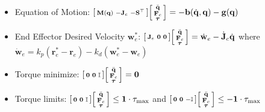 \documentclass[landscape,a0paper,fontscale=0.285]{baposter} %
\renewenvironment{bmatrix}{\left[\begin{smallmatrix}}{\end{smallmatrix}\right]}
\begin{document}
\begin{poster}
{\begin{itemize}
    \item Equation of Motion: $\begin{bmatrix}\mathbf{M}(\mathbf{q}) & -\mathbf{J}_c & -\mathbf{S}^\top\end{bmatrix}\begin{bmatrix}\ddot{\mathbf{q}} \\ \mathbf{F}_c \\ \boldsymbol{\tau}\end{bmatrix} = -\mathbf{b}(\dot{\mathbf{q}},\mathbf{q}) - \mathbf{g}(\mathbf{q})$
    \item End Effector Desired Velocity $\mathbf{w}^*_e$: $\begin{bmatrix}\mathbf{J}_e & \mathbf{0} & \mathbf{0}\end{bmatrix}\begin{bmatrix}\ddot{\mathbf{q}} \\ \mathbf{F}_c \\ \boldsymbol{\tau}\end{bmatrix} = \dot{\mathbf{w}}_e - \dot{\mathbf{J}}_c \dot{\mathbf{q}}$ where $\dot{\mathbf{w}}_e = k_p(\mathbf{r}_e^* - \mathbf{r}_e) - k_d(\mathbf{w}_e^* - \mathbf{w}_e)$
    \item Torque minimize: $\begin{bmatrix}\mathbf{0} & \mathbf{0} & \mathbb{I}\end{bmatrix}\begin{bmatrix}\ddot{\mathbf{q}} \\ \mathbf{F}_c \\ \boldsymbol{\tau}\end{bmatrix} = \mathbf{0}$
    \item Torque limits: $\begin{bmatrix}\mathbf{0} & \mathbf{0} & \mathbb{I}\end{bmatrix}\begin{bmatrix}\ddot{\mathbf{q}} \\ \mathbf{F}_c \\ \boldsymbol{\tau}\end{bmatrix} \le \mathbf{1} \cdot \tau_{\text{max}}$ and $\begin{bmatrix}\mathbf{0} & \mathbf{0} & -\mathbb{I}\end{bmatrix}\begin{bmatrix}\ddot{\mathbf{q}} \\ \mathbf{F}_c \\ \boldsymbol{\tau}\end{bmatrix} \le -\mathbf{1} \cdot \tau_{\text{max}}$
   

\end{itemize}}
\end{poster}
\end{document}
